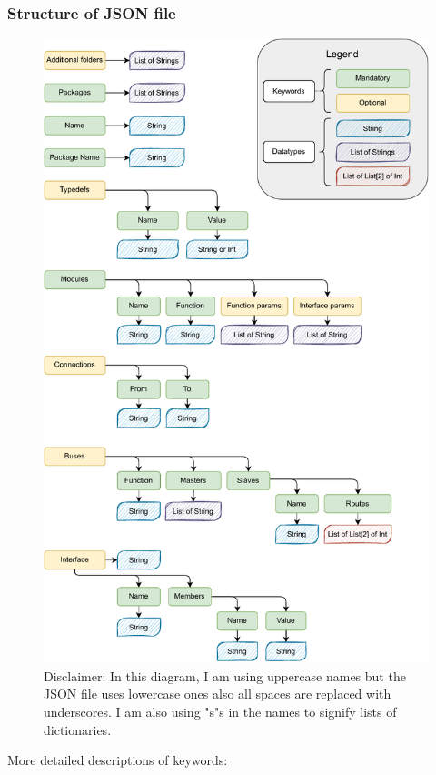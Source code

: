 \documentclass[12pt]{report}
\begin{document}
\subsubsection{Structure of JSON file}

\begin{figure}[H]
    \centering
\includegraphics[width=0.70\columnwidth]{pdfExports/LargeMapJSON.pdf}

\caption{Disclaimer: In this diagram, I am using uppercase names but the JSON file uses lowercase ones also all spaces are replaced with underscores. I am also using "s"s in the names to signify lists of dictionaries.}

\end{figure}
\newpage
More detailed descriptions of keywords: 
\end{document}
